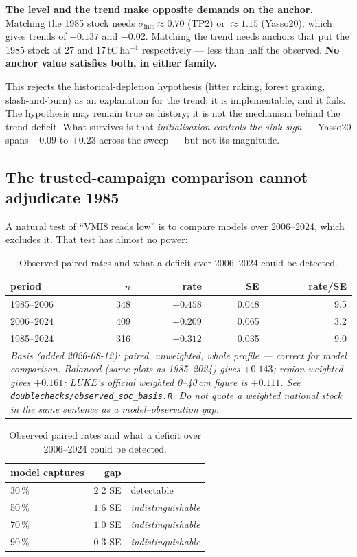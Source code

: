 \documentclass[11pt]{article}
\newcommand{\sinit}{\sigma_{\mathrm{init}}}
\begin{document}
\noindent \textbf{The level and the trend make opposite demands on the anchor.} Matching the 1985
stock needs $\sinit \approx 0.70$ (TP2) or $\approx 1.15$ (Yasso20), which gives trends of
$+0.137$ and $-0.02$. Matching the trend needs anchors that put the 1985 stock at $27$ and
$17$\,tC\,ha$^{-1}$ respectively --- less than half the observed. \textbf{No anchor value satisfies
both, in either family.}

This rejects the historical-depletion hypothesis (litter raking, forest grazing, slash-and-burn)
as an explanation for the trend: it is implementable, and it fails. The hypothesis may remain true
as history; it is not the mechanism behind the trend deficit. What survives is that
\emph{initialisation controls the sink sign} --- Yasso20 spans $-0.09$ to $+0.23$ across the sweep
--- but not its magnitude.

\subsection{The trusted-campaign comparison cannot adjudicate 1985}
\label{sec:power}

A natural test of ``VMI8 reads low'' is to compare models over 2006--2024, which excludes it. That
test has almost no power:

\begin{table}[H]\centering\small
\caption{Observed paired rates and what a deficit over 2006--2024 could be detected.}
\begin{tabular}{lrrrr}
\toprule
period & $n$ & rate & SE & rate/SE\\
\midrule
1985--2006 & 348 & $+0.458$ & 0.048 & 9.5\\
2006--2024 & 409 & $+0.209$ & 0.065 & 3.2\\
1985--2024 & 316 & $+0.312$ & 0.035 & 9.0\\
\midrule
\multicolumn{5}{l}{\footnotesize\emph{Basis (added 2026-08-12): paired, unweighted, whole
profile --- correct for model comparison. Balanced (same plots as 1985--2024) gives $+0.143$;
region-weighted gives $+0.161$; LUKE's official weighted 0--40\,cm figure is $+0.111$. See
\texttt{doublechecks/observed\_soc\_basis.R}. Do not quote a weighted national stock in the
same sentence as a model--observation gap.}}\\
\bottomrule
\end{tabular}
\quad
\begin{tabular}{lr l}
\toprule
model captures & gap & \\
\midrule
30\,\% & $2.2$ SE & detectable\\
50\,\% & $1.6$ SE & \emph{indistinguishable}\\
70\,\% & $1.0$ SE & \emph{indistinguishable}\\
90\,\% & $0.3$ SE & \emph{indistinguishable}\\
\bottomrule
\end{tabular}
\end{table}
\end{document}
